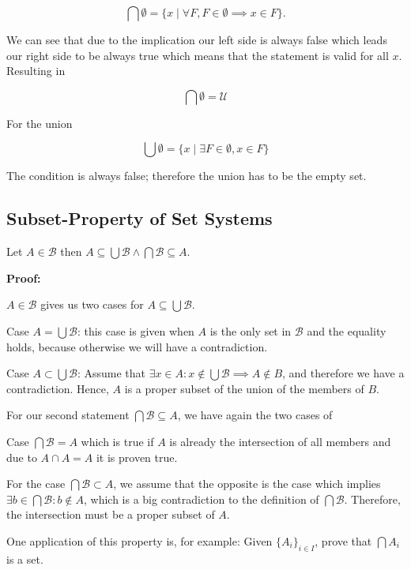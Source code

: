 \[
	\bigcap \emptyset = \{x \mid \forall F, F \in \emptyset \implies x \in F\}.
\]

We can see that due to the implication our left side is always false which leads
our right side to be always true which means that the statement is valid for all \(x\).
Resulting in

\[
	\bigcap \emptyset = \mathcal{U}
\]


For the union

\[
	\bigcup \emptyset = \{x \mid \exists F \in \emptyset, x \in F\}
\]

The condition is always false; therefore the union has to be the empty set.

\QED

\subsection{Subset-Property of Set Systems}

Let \(A \in \mathcal{B}\) then \(A \subseteq \bigcup \mathcal{B} \land \bigcap \mathcal{B} \subseteq A\).

\textbf{Proof:}

\(A \in \mathcal{B}\) gives us two cases for \(A \subseteq \bigcup \mathcal{B}\).

Case \(A = \bigcup \mathcal{B}\): this case is given when \(A\) is the only set in \(\mathcal{B}\) and the equality holds,
because otherwise we will have a contradiction.

Case \(A \subset \bigcup \mathcal{B}\): Assume that \(\exists x \in A: x \notin \bigcup \mathcal{B} \implies A \notin B\), and therefore we have
a contradiction. Hence, \(A\) is a proper subset of the union of the members of \(B\).

For our second statement \(\bigcap \mathcal{B} \subseteq A\), we have again the two cases of

Case \(\bigcap \mathcal{B} = A\) which is true if \(A\) is already the intersection of all members and due to \(A \cap A = A\) it is proven true.

For the case \(\bigcap \mathcal{B} \subset A\), we assume that the opposite is the case which implies \(\exists b \in \bigcap \mathcal{B}: b \notin A\), which
is a big contradiction to the definition of \(\bigcap \mathcal{B}\). Therefore, the intersection must be a proper subset of \(A\).

\QED

One application of this property is, for example: Given \(\{A_i\}_{i \in I}\), prove that \(\bigcap A_i\) is a set.

